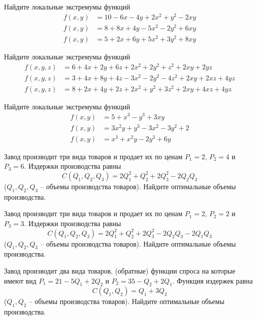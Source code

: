 
\begin{exercise}
Найдите локальные экстремумы функций
\begin{align*}
	f(x,y) &= 10-6x-4y+2x^2+y^2-2xy \\
	f(x,y) &= 8+8x+4y-5x^2-2y^2+6xy \\
	f(x,y) &= 5+2x+6y+5x^2+3y^2+8xy
\end{align*}
\end{exercise}

\begin{exercise}
Найдите локальные экстремумы функций
\begin{align*}
	f(x,y,z) &= 6+4x+2y+6z+2x^2+2y^2+z^2+2xy+2yz \\
	f(x,y,z) &= 3+4x+8y+4z-3x^2-2y^2-4z^2+2xy+2xz+4yz\\
	f(x,y,z) &= 8+2x+4y+2z+2x^2+y^2+3z^2+2xy+4xz+4yz
\end{align*}
\end{exercise}

\begin{exercise}
Найдите локальные экстремумы функций
\begin{align*}
	f(x,y) &= 5+x^3-y^3+3xy \\
	f(x,y) &= 3x^2y+y^3-3x^2-3y^2+2 \\
	f(x,y) &= x^3+x^2y-2y^3+6y
\end{align*}
\end{exercise}

\begin{exercise}
Завод производит три вида товаров и продает их по ценам $P_1=2$, $P_2=4$ и $P_3=6$.
Издержки производства равны
\[
	C(Q_1,Q_2,Q_3)=2Q_1^2+Q_2^2+2Q_3^2-2Q_2Q_3
\]
($Q_1, Q_2, Q_3$ -- объемы производства товаров). Найдите оптимальные объемы производства. 
\end{exercise}

\begin{exercise}
Завод производит три вида товаров и продает их по ценам $P_1=2$, $P_2=2$ и $P_3=3$.
Издержки производства равны 
\[
	C(Q_1,Q_2,Q_3)=2Q_1^2+Q_2^2+2Q_3^2-2Q_2Q_3-2Q_1Q_3
\]
($Q_1, Q_2, Q_3$ -- объемы производства товаров).
Найдите оптимальные объемы производства.
\end{exercise}

\begin{exercise}
Завод производит два вида товаров, (обратные) функции спроса на которые
имеют вид $P_1=21-5Q_1+2Q_2$ и $P_2=35-Q_2+2Q_1$. Функция
издержек равна
\[
	C(Q_1,Q_2)=Q_1+3Q_2
\]
($Q_1, Q_2$ -- объемы производства товаров). Найдите оптимальные объемы производства. 
\end{exercise}

